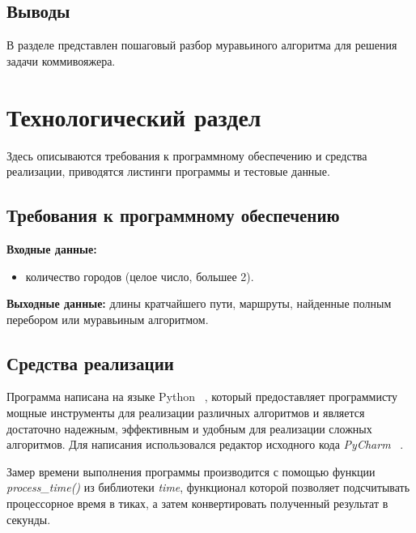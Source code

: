 \documentclass[a4paper,12pt]{article}
\begin{document}

\subsection*{Выводы}

В разделе представлен пошаговый разбор
муравьиного алгоритма для решения задачи коммивояжера.


\section{Технологический раздел}

Здесь описываются требования к программному 
обеспечению и средства реализации, приводятся листинги 
программы и тестовые данные.

\subsection{Требования к программному обеспечению}

\begin{flushleft}
	\textbf{Входные данные:} 
	\begin{itemize}
		\item количество городов (целое число, большее 2).
	\end{itemize}
	
	\textbf{Выходные данные:} длины кратчайшего пути, маршруты,
	найденные полным перебором
	или муравьиным алгоритмом.
\end{flushleft}

\subsection{Средства реализации}

Программа написана на языке Python ~\cite{python}, который 
предоставляет программисту мощные инструменты для реализации различных алгоритмов и является достаточно 
надежным, эффективным и удобным для реализации сложных алгоритмов. Для написания использовался 
редактор исходного кода \textit{PyCharm} ~\cite{pycharm}.

Замер времени выполнения программы 
производится с помощью функции \textit{process\_time()} из библиотеки \textit{time},
функционал которой позволяет подсчитывать процессорное время в тиках,
а затем конвертировать полученный результат в секунды.
\end{document}
